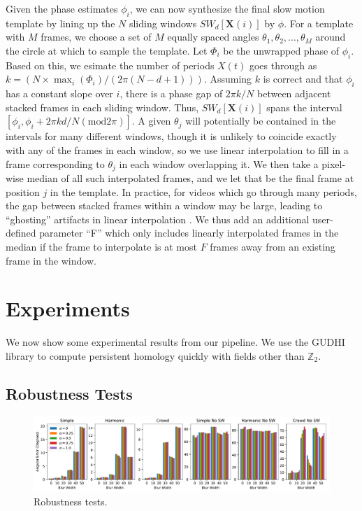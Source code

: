\documentclass{article}
\newcommand{\mb}{\mathbf}
\begin{document}
Given the phase estimates $\phi_i$, we can now synthesize the final slow motion template by lining up the $N$ sliding windows $SW_{d}[\mb{X}(i)]$ by $\phi$.  For a template with $M$ frames, we choose a set of $M$ equally spaced angles $\theta_1, \theta_2, ..., \theta_M$ around the circle at which to sample the template.  Let $\Phi_i$ be the unwrapped phase of $\phi_i$.  Based on this, we esimate the number of periods $X(t)$ goes through as $k = (N \times \max_i(\Phi_i) / (2 \pi (N-d+1)))$.  Assuming $k$ is correct and that $\phi_i$ has a constant slope over $i$, there is a phase gap of $2 \pi k/N$ between adjacent stacked frames in each sliding window.  Thus, $SW_{d}[\mb{X}(i)]$ spans the interval $[\phi_i, \phi_i + 2\pi k d/N (\text{mod} 2 \pi)]$.  A given $\theta_j$ will potentially be contained in the intervals for many different windows, though it is unlikely to coincide exactly with any of the frames in each window, so we use linear interpolation to fill in a frame corresponding to $\theta_j$ in each window overlapping it.  We then take a pixel-wise median of all such interpolated frames, and we let that be the final frame at position $j$ in the template.  In practice, for videos which go through many periods, the gap between stacked frames within a window may be large, leading to ``ghosting'' artifacts in linear interpolation \cite{meyer2015phase}.  We thus add an additional user-defined parameter ``F'' which only includes linearly interpolated frames in the median if the frame to interpolate is at most $F$ frames away from an existing frame in the window.

\section{Experiments}
\label{sec:experiments}

We now show some experimental results from our pipeline.  We use the GUDHI library\cite{maria2014gudhi} to compute persistent homology quickly with fields other than $\mathbb{Z}_2$.

\subsection{Robustness Tests}


\begin{figure}
\centering
\includegraphics[width=\columnwidth]{RobustnessTestsShake.pdf}
\caption{Robustness tests.}
\label{fig:RobustnessTestsShake}
\end{figure}
\end{document}
